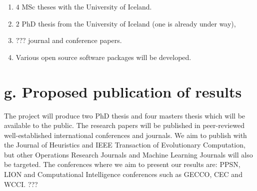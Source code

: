 \documentclass[12pt,a4paper]{article}
\begin{document}
\begin{enumerate}
  \item $4$  MSc theses with the University of Iceland.
  \item $2$  PhD thesis from the University of Iceland (one is already under way),
  \item $???$  journal and conference papers. 
  \item Various open source software packages will be developed.
\end{enumerate}


\section*{\normalsize g. Proposed publication of results}

The project will produce two PhD thesis and four masters thesis which will be available to the public. The research 
papers will be published in peer-reviewed well-established international conferences and journals. We aim to publish 
with the Journal of Heuristics and IEEE Transaction of Evolutionary Computation, but other Operations Research 
Journals and Machine Learning Journals will also be targeted. The conferences where we aim to present our results are: 
PPSN, LION and Computational Intelligence conferences such as GECCO, CEC and WCCI. ???


\pagebreak
 

\end{document}
